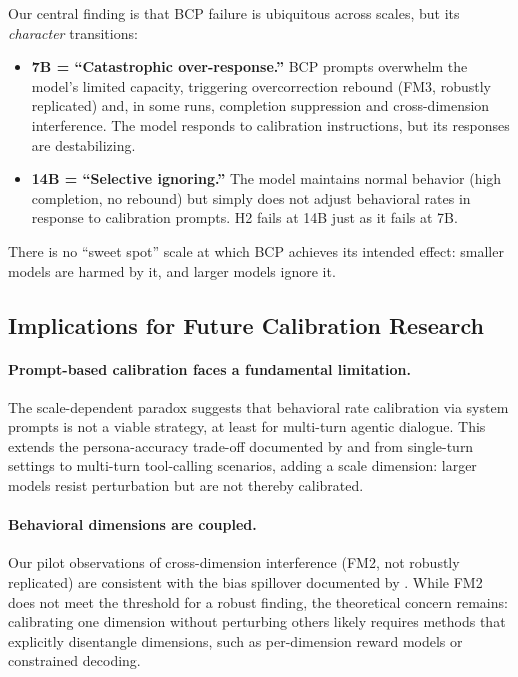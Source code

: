 \documentclass[11pt]{article}
\begin{document}
Our central finding is that BCP failure is ubiquitous across scales, but its \emph{character} transitions:

\begin{itemize}
    \item \textbf{7B = ``Catastrophic over-response.''} BCP prompts overwhelm the model's limited capacity, triggering overcorrection rebound (FM3, robustly replicated) and, in some runs, completion suppression and cross-dimension interference. The model responds to calibration instructions, but its responses are destabilizing.
    \item \textbf{14B = ``Selective ignoring.''} The model maintains normal behavior (high completion, no rebound) but simply does not adjust behavioral rates in response to calibration prompts. H2 fails at 14B just as it fails at 7B.
\end{itemize}

There is no ``sweet spot'' scale at which BCP achieves its intended effect: smaller models are harmed by it, and larger models ignore it.

\subsection{Implications for Future Calibration Research}

\paragraph{Prompt-based calibration faces a fundamental limitation.}
The scale-dependent paradox suggests that behavioral rate calibration via system prompts is not a viable strategy, at least for multi-turn agentic dialogue.
This extends the persona-accuracy trade-off documented by \citet{basil2025playing_pretend} and \citet{hu2026expert_persona} from single-turn settings to multi-turn tool-calling scenarios, adding a scale dimension: larger models resist perturbation but are not thereby calibrated.

\paragraph{Behavioral dimensions are coupled.}
Our pilot observations of cross-dimension interference (FM2, not robustly replicated) are consistent with the bias spillover documented by \citet{gupta2026intra_fairness}.
While FM2 does not meet the threshold for a robust finding, the theoretical concern remains: calibrating one dimension without perturbing others likely requires methods that explicitly disentangle dimensions, such as per-dimension reward models or constrained decoding.
\end{document}
